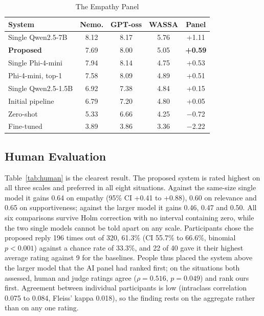 \documentclass[conference]{IEEEtran}
\begin{document}
\begin{table}[htbp]
\caption{The Empathy Panel}
\begin{center}
\begin{tabular}{|l|c|c|c|c|}
\hline
\textbf{System} & \textbf{Nemo.} & \textbf{GPT-oss} & \textbf{WASSA} & \textbf{Panel} \\
\hline
Single Qwen2.5-7B & 8.12 & 8.17 & 5.76 & +1.11 \\
\textbf{Proposed} & 7.69 & 8.00 & 5.05 & \textbf{+0.59} \\
Single Phi-4-mini & 7.94 & 8.14 & 4.75 & +0.53 \\
Phi-4-mini, top-1 & 7.58 & 8.09 & 4.89 & +0.51 \\
Single Qwen2.5-1.5B & 6.92 & 7.38 & 4.84 & +0.15 \\
Initial pipeline & 6.79 & 7.20 & 4.80 & +0.05 \\
Zero-shot & 5.33 & 6.66 & 4.25 & $-$0.72 \\
Fine-tuned & 3.89 & 3.86 & 3.36 & $-$2.22 \\
\hline
\end{tabular}
\label{tab:panel}
\end{center}
\end{table}

\subsection{Human Evaluation}
Table~\ref{tab:human} is the clearest result. The proposed system is rated highest on all three scales and preferred in all eight situations. Against the same-size single model it gains 0.64 on empathy (95\% CI +0.41 to +0.88), 0.60 on relevance and 0.65 on supportiveness; against the larger model it gains 0.46, 0.47 and 0.50. All six comparisons survive Holm correction with no interval containing zero, while the two single models cannot be told apart on any scale. Participants chose the proposed reply 196 times out of 320, 61.3\% (CI 55.7\% to 66.6\%, binomial $p<0.001$) against a chance rate of 33.3\%, and 22 of 40 gave it their highest average rating against 9 for the baselines. People thus placed the system above the larger model that the AI panel had ranked first; on the situations both assessed, human and judge ratings agree ($\rho=0.516$, $p=0.049$) and rank ours first. Agreement between individual participants is low (intraclass correlation 0.075 to 0.084, Fleiss' kappa 0.018), so the finding rests on the aggregate rather than on any one rating.
\end{document}
